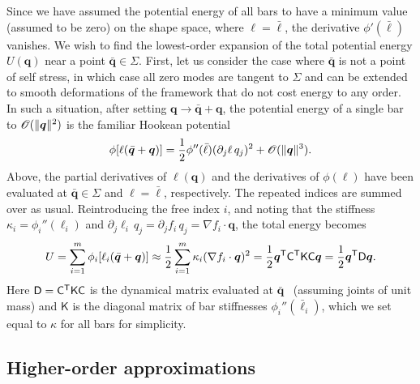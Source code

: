 Since we have assumed the potential energy of all bars to have a minimum value (assumed to be zero) on the shape space, where $\ell = \bar{\ell}$, the derivative $\phi'(\bar{\ell})$ vanishes.
We wish to find the lowest-order expansion of the total potential energy $U(\bm{q})$ near a point $\bar{\bm{q}} \in \Sigma$.
First, let us consider the case where $\bar{\bm{q}}$ is not a point of self stress, in which case all zero modes are tangent to $\Sigma$ and can be extended to smooth deformations of the framework that do not cost energy to any order.
In such a situation, after setting $\bm{q} \to \bar{\bm{q}} + \bm{q}$, the potential energy of a single bar to $\mathscr{O}(\lVert\bm{q}\rVert^2)$ is the familiar Hookean potential
%
\begin{equation}
  \phi[\ell(\bar{\bm{q}} + \bm{q})] =  \frac{1}{2}\phi''(\bar{\ell})(\partial_j \ell\,q_j)^2 + \mathscr{O}(\lVert\bm{q}\rVert^3).
\end{equation}
%
Above, the partial derivatives of $\ell(\bm{q})$ and the derivatives of $\phi(\ell)$ have been evaluated at $\bar{\bm{q}} \in \Sigma$ and $\ell = \bar{\ell}$, respectively.
The repeated indices are summed over as usual.
Reintroducing the free index $i$, and noting that the stiffness $\kappa_{i} = \phi_{i}''(\ell_{i})$ and $\partial_{j}\ell_{i}\,q_{j} = \partial_{j}f_{i}\,q_{j} = \nabla f_{i}\cdot\bm{q}$, the total energy becomes
%
\begin{equation}
  U = \sum_{i=1}^m \phi_i[\ell_i(\bar{\bm{q}} + \bm{q})] \approx \frac{1}{2} \sum_{i=1}^m \kappa_i (\nabla f_i\cdot\bm{q})^2 = \frac{1}{2}\bm{q}^\mathsf{T}\mathsf{C}^\mathsf{T}\mathsf{K}\mathsf{C}\bm{q} = \frac{1}{2}\bm{q}^\mathsf{T}\mathsf{D}\bm{q}.
  \label{eq:regenergy}
\end{equation}
%
Here $\mathsf{D} = \mathsf{C}^\mathsf{T}\mathsf{K}\mathsf{C}$ is the dynamical matrix evaluated at $\bar{\bm{q}}$~\cite{lubensky2015} (assuming joints of unit mass) and $\mathsf{K}$ is the diagonal matrix of bar stiffnesses $\phi_{i}''(\bar{\ell}_{i})$, which we set equal to $\kappa$ for all bars for simplicity.

\subsection{Higher-order approximations}

